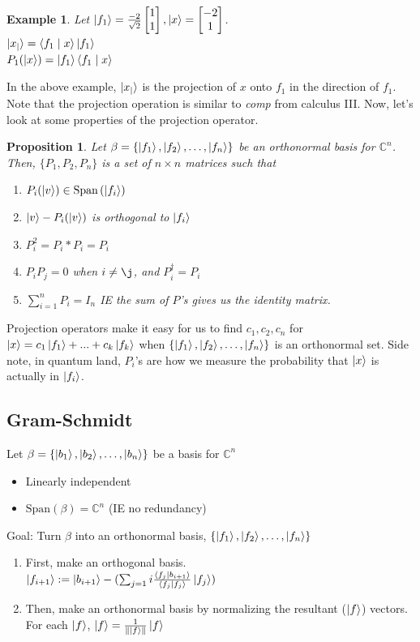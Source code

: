 \documentclass[12pt]{article}
\theoremstyle{plain}
\newtheorem{proposition}[lemma]{Proposition}
\theoremstyle{nonumberplain}
\theoremstyle{plain}
\newtheorem{example}[lemma]{Example}
\theoremstyle{nonumberplain}
\newcommand\1{{\bf 1}}
\newcommand{\bmat}[1]{\begin{bmatrix*} #1 \end{bmatrix*}} %
\newcommand{\C}{\mathbb{C}} %
\newcommand{\<}{\left\langle}
\renewcommand{\>}{\right\rangle}
\newcommand{\lp}{\left(}
\newcommand{\rp}{\right)}
\newcommand{\lb}{\left\{}
\newcommand{\rb}{\right\}}
\newcommand{\norm}[1]{\left\lVert#1\right\rVert} %
\newcommand{\inp}[2]{\left\langle#1\mid #2\right\rangle} %
\newcommand{\spn}[1]{\text{Span}\lp #1\rp} %
\newcommand{\setofkets}[1]{\lb \ket{#1_1}, \ket{#1_2}, \ldots, \ket{#1_n}\rb} %
\begin{document}
\begin{example}
Let $\ket{f_1}=\frac{-2}{\sqrt{2}}\bmat{1 \\ 1},\ket{x}=\bmat{-2 \\ 1}$. \\
$\ket{x_|}=\inp{f_1}{x}\ket{f_1}$ \\
$P_1(\ket{x})=\ket{f_1}\inp{f_1}{x}$
\end{example}
In the above example, $\ket{x_|}$ is the projection of $x$ onto $f_1$ in the direction of $f_1$.
Note that the projection operation is similar to \textit{comp} from calculus III. Now, let's look at some properties of the projection operator.
\begin{proposition}
Let $\beta=\setofkets{f}$ be an orthonormal basis for $\C^n$. Then, $\lbrace P_1, P_2, P_n\rbrace$ is a set of $n\times n$ matrices such that
\begin{enumerate}
\item $P_i(\ket{v})\in\spn{\ket{f_i}}$
\item $\ket{v}-P_i(\ket{v})$ is orthogonal to $\ket{f_i}$
\item $P_i^2=P_i*P_i=P_i$
\item $P_iP_j=0$ when $i\neq\j$, and $P_i^\dagger=P_i$
\item $\sum_{i=1}^{n} P_i=I_n$ IE the sum of $P$'s gives us the identity matrix.
\end{enumerate}
\end{proposition}

Projection operators make it easy for us to find $c_1, c_2, c_n$ for $\ket{x}=c_1\ket{f_1}+...+c_k\ket{f_k}$ when $\setofkets{f}$ is an orthonormal set. Side note, in quantum land, $P_i$'s are how we measure the probability that $\ket{x}$ is actually in $\ket{f_i}$.


\subsection{Gram-Schmidt}

Let $\beta=\setofkets{b}$ be a basis for $\C^n$
\begin{itemize}
\item Linearly independent
\item $\spn{\beta}=\C^n$ (IE no redundancy)
\end{itemize}
Goal: Turn $\beta$ into an orthonormal basis, $\setofkets{f}$
\begin{enumerate}
\item First, make an orthogonal basis. \\
$\ket{f_{i+1}}:=\ket{b_{i+1}}-(\sum_{j=1}{i} \frac{\inp{f_j}{b_{i+1}}}{\inp{f_j}{f_j}}\ket{f_j})$
\item Then, make an orthonormal basis by normalizing the resultant ($\ket{f}$) vectors. \\
For each $\ket{f}$, $\ket{f}=\frac{1}{\norm{\ket{f}}}\ket{f}$
\end{enumerate}
\end{document}
